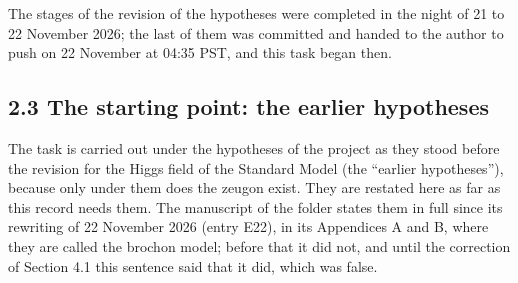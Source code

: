 \documentclass[
  10pt,
]{article}
\begin{document}
The stages of the revision of the hypotheses were completed in the night
of 21 to 22 November 2026; the last of them was committed and handed to
the author to push on 22 November at 04:35 PST, and this task began
then.

\hypertarget{the-starting-point-the-earlier-hypotheses}{%
\subsection{2.3 The starting point: the earlier
hypotheses}\label{the-starting-point-the-earlier-hypotheses}}

The task is carried out under the hypotheses of the project as they
stood before the revision for the Higgs field of the Standard Model (the
``earlier hypotheses''), because only under them does the zeugon exist.
They are restated here as far as this record needs them. The manuscript
of the folder states them in full since its rewriting of 22 November
2026 (entry E22), in its Appendices A and B, where they are called the
brochon model; before that it did not, and until the correction of
Section 4.1 this sentence said that it did, which was false.
\end{document}

